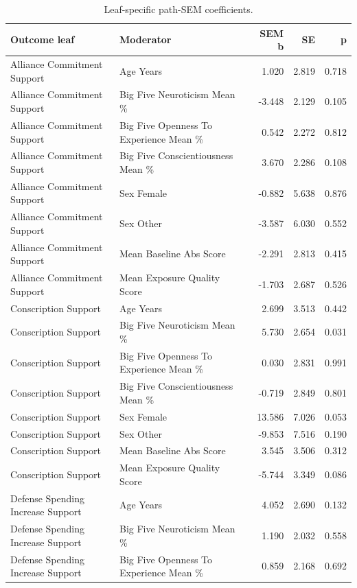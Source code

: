 \begin{table}[htbp]
\raggedright
\caption{Leaf-specific path-SEM coefficients.}
\label{tab:sempaths}
{
\footnotesize
\setlength{\tabcolsep}{4pt}
\renewcommand{\arraystretch}{1.08}
\begin{tabular}{llrrr}
\toprule
Outcome leaf & Moderator & SEM b & SE & p \\
\midrule
Alliance Commitment Support & Age Years & 1.020 & 2.819 & 0.718 \\
Alliance Commitment Support & Big Five Neuroticism Mean \% & -3.448 & 2.129 & 0.105 \\
Alliance Commitment Support & Big Five Openness To Experience Mean \% & 0.542 & 2.272 & 0.812 \\
Alliance Commitment Support & Big Five Conscientiousness Mean \% & 3.670 & 2.286 & 0.108 \\
Alliance Commitment Support & Sex Female & -0.882 & 5.638 & 0.876 \\
Alliance Commitment Support & Sex Other & -3.587 & 6.030 & 0.552 \\
Alliance Commitment Support & Mean Baseline Abs Score & -2.291 & 2.813 & 0.415 \\
Alliance Commitment Support & Mean Exposure Quality Score & -1.703 & 2.687 & 0.526 \\
Conscription Support & Age Years & 2.699 & 3.513 & 0.442 \\
Conscription Support & Big Five Neuroticism Mean \% & 5.730 & 2.654 & 0.031 \\
Conscription Support & Big Five Openness To Experience Mean \% & 0.030 & 2.831 & 0.991 \\
Conscription Support & Big Five Conscientiousness Mean \% & -0.719 & 2.849 & 0.801 \\
Conscription Support & Sex Female & 13.586 & 7.026 & 0.053 \\
Conscription Support & Sex Other & -9.853 & 7.516 & 0.190 \\
Conscription Support & Mean Baseline Abs Score & 3.545 & 3.506 & 0.312 \\
Conscription Support & Mean Exposure Quality Score & -5.744 & 3.349 & 0.086 \\
Defense Spending Increase Support & Age Years & 4.052 & 2.690 & 0.132 \\
Defense Spending Increase Support & Big Five Neuroticism Mean \% & 1.190 & 2.032 & 0.558 \\
Defense Spending Increase Support & Big Five Openness To Experience Mean \% & 0.859 & 2.168 & 0.692 \\

\end{tabular}}
\end{table}
